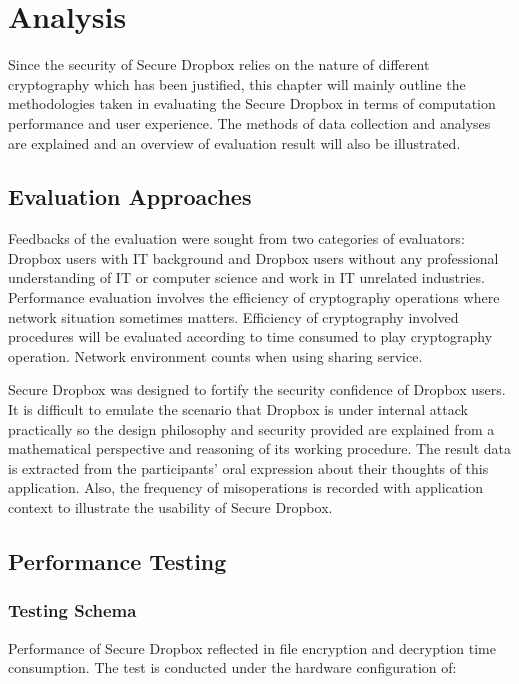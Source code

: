 \chapter{Analysis}

Since the security of Secure Dropbox relies on the nature of different cryptography which has been justified, this chapter will mainly outline the methodologies taken in evaluating the Secure Dropbox in terms of computation performance and user experience. The methods of data collection and analyses are explained and an overview of evaluation result will also be illustrated.

\section{Evaluation Approaches}

Feedbacks of the evaluation were sought from two categories of evaluators: Dropbox users with IT background and Dropbox users without any professional understanding of IT or computer science and work in IT unrelated industries. Performance evaluation involves the efficiency of cryptography operations where network situation sometimes matters. Efficiency of cryptography involved procedures will be evaluated according to time consumed to play cryptography operation. Network environment counts when using sharing service.

Secure Dropbox was designed to fortify the security confidence of Dropbox users. It is difficult to emulate the scenario that Dropbox is under internal attack practically so the design philosophy and security provided are explained from a mathematical perspective and reasoning of its working procedure. The result data is extracted from the participants’ oral expression about their thoughts of this application. Also, the frequency of misoperations is recorded with application context to illustrate the usability of Secure Dropbox.

\section{Performance Testing}

\subsection{Testing Schema}
Performance of Secure Dropbox reflected in file encryption and decryption time consumption. The test is conducted under the hardware configuration of:

